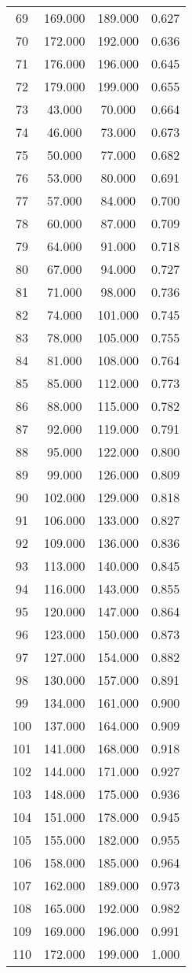 \begin{tabular}{cccc}
  69 & 169.000 & 189.000 & 0.627 \\ 
  70 & 172.000 & 192.000 & 0.636 \\ 
  71 & 176.000 & 196.000 & 0.645 \\ 
  72 & 179.000 & 199.000 & 0.655 \\ 
  73 & 43.000 & 70.000 & 0.664 \\ 
  74 & 46.000 & 73.000 & 0.673 \\ 
  75 & 50.000 & 77.000 & 0.682 \\ 
  76 & 53.000 & 80.000 & 0.691 \\ 
  77 & 57.000 & 84.000 & 0.700 \\ 
  78 & 60.000 & 87.000 & 0.709 \\ 
  79 & 64.000 & 91.000 & 0.718 \\ 
  80 & 67.000 & 94.000 & 0.727 \\ 
  81 & 71.000 & 98.000 & 0.736 \\ 
  82 & 74.000 & 101.000 & 0.745 \\ 
  83 & 78.000 & 105.000 & 0.755 \\ 
  84 & 81.000 & 108.000 & 0.764 \\ 
  85 & 85.000 & 112.000 & 0.773 \\ 
  86 & 88.000 & 115.000 & 0.782 \\ 
  87 & 92.000 & 119.000 & 0.791 \\ 
  88 & 95.000 & 122.000 & 0.800 \\ 
  89 & 99.000 & 126.000 & 0.809 \\ 
  90 & 102.000 & 129.000 & 0.818 \\ 
  91 & 106.000 & 133.000 & 0.827 \\ 
  92 & 109.000 & 136.000 & 0.836 \\ 
  93 & 113.000 & 140.000 & 0.845 \\ 
  94 & 116.000 & 143.000 & 0.855 \\ 
  95 & 120.000 & 147.000 & 0.864 \\ 
  96 & 123.000 & 150.000 & 0.873 \\ 
  97 & 127.000 & 154.000 & 0.882 \\ 
  98 & 130.000 & 157.000 & 0.891 \\ 
  99 & 134.000 & 161.000 & 0.900 \\ 
  100 & 137.000 & 164.000 & 0.909 \\ 
  101 & 141.000 & 168.000 & 0.918 \\ 
  102 & 144.000 & 171.000 & 0.927 \\ 
  103 & 148.000 & 175.000 & 0.936 \\ 
  104 & 151.000 & 178.000 & 0.945 \\ 
  105 & 155.000 & 182.000 & 0.955 \\ 
  106 & 158.000 & 185.000 & 0.964 \\ 
  107 & 162.000 & 189.000 & 0.973 \\ 
  108 & 165.000 & 192.000 & 0.982 \\ 
  109 & 169.000 & 196.000 & 0.991 \\ 
  110 & 172.000 & 199.000 & 1.000 \\ 
   \hline
\end{tabular}
